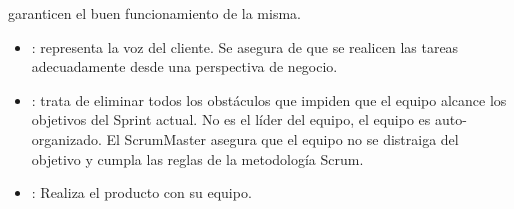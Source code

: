 garanticen el buen funcionamiento de la misma.
\begin{itemize}
\item {}: representa la voz del cliente. Se asegura
  de que se realicen las tareas adecuadamente desde una perspectiva de
  negocio.
\item {}: trata de eliminar todos los
  obstáculos que impiden que el equipo alcance los objetivos del
  Sprint actual. No es el líder del equipo, el equipo es
  auto-organizado. El ScrumMaster asegura que el equipo no se
  distraiga del objetivo y cumpla las reglas de la metodología Scrum.
\item {}: Realiza el producto con su equipo.
\end{itemize}
